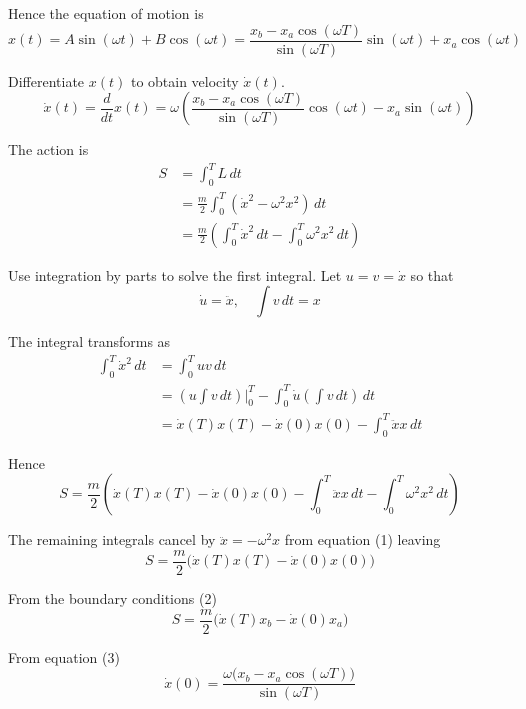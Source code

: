 Hence the equation of motion is
\begin{equation*}
x(t)
=A\sin(\omega t)+B\cos(\omega t)
=\frac{x_b-x_a\cos(\omega T)}{\sin(\omega T)}\sin(\omega t)+x_a\cos(\omega t)
\tag{3}
\end{equation*}

Differentiate $x(t)$ to obtain velocity $\dot x(t)$.
\begin{equation*}
\dot x(t)=\frac{d}{dt}x(t)=
\omega\left(
\frac{x_b-x_a\cos(\omega T)}{\sin(\omega T)}\cos(\omega t)-x_a\sin(\omega t)
\right)
\tag{4}
\end{equation*}

The action is
\begin{align*}
S&=\int_0^TL\,dt
\\
&=\frac{m}{2}\int_0^T (\dot{x}^2-\omega^2 x^2)\,dt
\\
&=\frac{m}{2}\left(
\int_0^T\dot{x}^2\,dt
-\int_0^T\omega^2x^2\,dt
\right)
\end{align*}

Use integration by parts to solve the first integral.
Let $u=v=\dot x$ so that
\begin{equation*}
\dot u=\ddot x,\quad
\int v\,dt=x
\end{equation*}

The integral transforms as
\begin{align*}
\int_0^T \dot x^2\,dt
&=\int_0^T uv\,dt
\\
&=\left(u\int v\,dt\right)\bigg|_0^T
-\int_0^T\dot u\left(\int v\,dt\right)\,dt
\\
&=\dot x(T)x(T)-\dot x(0)x(0)-\int_0^T \ddot xx\,dt
\end{align*}

Hence
\begin{equation*}
S=\frac{m}{2}\left(
\dot x(T)x(T)-\dot x(0)x(0)
-\int_0^T \ddot xx\,dt
-\int_0^T\omega^2x^2\,dt
\right)
\end{equation*}

The remaining integrals cancel by $\ddot x=-\omega^2x$ from equation (1) leaving
\begin{equation*}
S=\frac{m}{2}\bigl(\dot x(T)x(T)-\dot x(0)x(0)\bigr)
\tag{5}
\end{equation*}

From the boundary conditions (2)
\begin{equation*}
S=\frac{m}{2}\bigl(\dot x(T)x_b-\dot x(0)x_a\bigr)
\end{equation*}

From equation (3)
\begin{equation*}
\dot x(0)=\frac{\omega\bigl(x_b-x_a\cos(\omega T)\bigr)}{\sin(\omega T)}
\tag{6}
\end{equation*}

